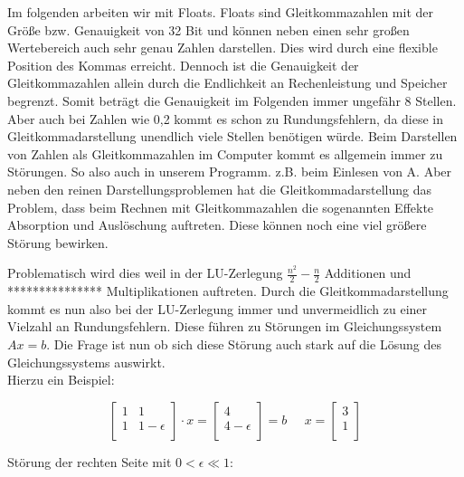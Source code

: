 \documentclass[course=erap]{aspdoc}
\begin{document}
Im folgenden arbeiten wir mit Floats. Floats sind Gleitkommazahlen mit der Größe 
bzw. Genauigkeit von 32 Bit und können neben einen sehr großen Wertebereich auch 
sehr genau Zahlen darstellen. Dies wird durch eine flexible Position des Kommas erreicht.
 Dennoch ist die Genauigkeit der Gleitkommazahlen allein durch die Endlichkeit an 
Rechenleistung und Speicher begrenzt. Somit beträgt die 
Genauigkeit im Folgenden immer ungefähr 8 Stellen. Aber auch bei Zahlen wie 
0,2 kommt es schon zu Rundungsfehlern, da diese in Gleitkommadarstellung unendlich 
viele Stellen benötigen würde. Beim Darstellen von Zahlen als Gleitkommazahlen im Computer
 kommt es allgemein immer zu Störungen. So also auch in unserem Programm. z.B. beim Einlesen von A.
Aber neben den reinen Darstellungsproblemen hat die Gleitkommadarstellung das Problem, dass beim Rechnen mit 
Gleitkommazahlen die sogenannten Effekte Absorption und Auslöschung auftreten. Diese können noch eine viel größere Störung bewirken.

Problematisch wird dies weil in der LU-Zerlegung $\frac{n^2}{2} - \frac{n}{2} $
Additionen und *************** Multiplikationen auftreten\cite{LUGenauigkeit}.
Durch die Gleitkommadarstellung kommt es nun also bei der LU-Zerlegung immer und 
unvermeidlich zu einer Vielzahl an Rundungsfehlern.
Diese führen zu Störungen im Gleichungssystem $Ax=b$. Die Frage ist nun ob sich diese 
Störung auch stark auf die Lösung des Gleichungssystems auswirkt.\\

Hierzu ein Beispiel:

\begin{equation}
\label{absBeis}
 \begin{bmatrix}
 1	& 1	 \\
 1	& 1-\epsilon\\

 \end{bmatrix}
 \cdot x = 
  \begin{bmatrix}
 4 \\
 4- \epsilon\\

 \end{bmatrix}
  = b\;\;\;\;\;
  x = 
  \begin{bmatrix}
 3 \\
 1\\
\end{bmatrix}
\end{equation}

Störung der rechten Seite mit $ 0 < \epsilon \ll 1$:
\end{document}
